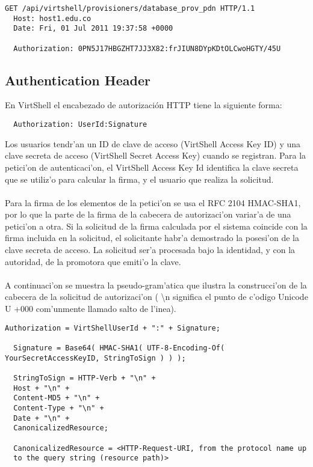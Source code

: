 \medskip
\begin{lstlisting}[style=json, caption=Petición HTTP con firma]
  GET /api/virtshell/provisioners/database_prov_pdn HTTP/1.1
  Host: host1.edu.co
  Date: Fri, 01 Jul 2011 19:37:58 +0000

  Authorization: 0PN5J17HBGZHT7JJ3X82:frJIUN8DYpKDtOLCwoHGTY/45U
\end{lstlisting}

\subsection{Authentication Header}

En VirtShell el encabezado de autorización HTTP tiene la siguiente forma:

\medskip
\begin{lstlisting}
  Authorization: UserId:Signature
\end{lstlisting}
\medskip

Los usuarios tendr'an un ID de clave de acceso (VirtShell Access Key ID) y una clave secreta de acceso (VirtShell Secret Access Key) cuando se registran. Para la petici'on de autenticaci'on, el VirtShell Access Key Id identifica la clave secreta que se utiliz'o para calcular la firma, y el usuario que realiza la solicitud.\\
\\
Para la firma de los elementos de la petici'on se usa el RFC 2104 HMAC-SHA1, por lo que la parte de la firma de la cabecera de autorizaci'on variar'a de una petici'on a otra. Si la solicitud de la firma calculada por el sistema coincide con la firma incluida en la solicitud, el solicitante habr'a demostrado la posesi'on de la clave secreta de acceso. La solicitud ser'a procesada bajo la identidad, y con la autoridad, de la promotora que emiti'o la clave.\\
\\
A continuaci'on se muestra la pseudo-gram'atica que ilustra la construcci'on de la cabecera de la solicitud de autorizaci'on (
\textbackslash{}n significa el punto de c'odigo Unicode U +000 com'unmente llamado salto de l'inea).

\medskip
\begin{lstlisting}[style=json, caption=cabecera de una solicitud de autorización]
  Authorization = VirtShellUserId + ":" + Signature;

  Signature = Base64( HMAC-SHA1( UTF-8-Encoding-Of( YourSecretAccessKeyID, StringToSign ) ) );

  StringToSign = HTTP-Verb + "\n" +
  Host + "\n" +
  Content-MD5 + "\n" +
  Content-Type + "\n" +
  Date + "\n" +
  CanonicalizedResource;

  CanonicalizedResource = <HTTP-Request-URI, from the protocol name up 
  to the query string (resource path)>
\end{lstlisting}

